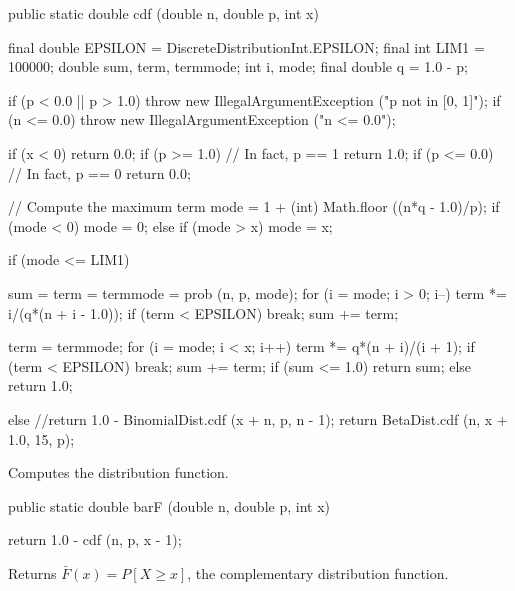 \begin{code}

   public static double cdf (double n, double p, int x)\begin{hide} {
      final double EPSILON = DiscreteDistributionInt.EPSILON;
      final int LIM1 = 100000;
      double sum, term, termmode;
      int i, mode;
      final double q = 1.0 - p;

      if (p < 0.0 || p > 1.0)
        throw new IllegalArgumentException ("p not in [0, 1]");
      if (n <= 0.0)
        throw new IllegalArgumentException ("n <= 0.0");

      if (x < 0)
         return 0.0;
      if (p >= 1.0)                  // In fact, p == 1
         return 1.0;
      if (p <= 0.0)                  // In fact, p == 0
         return 0.0;

      // Compute the maximum term
      mode = 1 + (int) Math.floor ((n*q - 1.0)/p);
      if (mode < 0)
          mode = 0;
      else if (mode > x)
         mode = x;

      if (mode <= LIM1) {
         sum = term = termmode = prob (n, p, mode);
         for (i = mode; i > 0; i--) {
            term *= i/(q*(n + i - 1.0));
            if (term < EPSILON)
               break;
            sum += term;
         }

         term = termmode;
         for (i = mode; i < x; i++) {
            term *= q*(n + i)/(i + 1);
            if (term < EPSILON)
               break;
            sum += term;
         }
         if (sum <= 1.0)
            return sum;
         else
            return 1.0;
      }
      else
         //return 1.0 - BinomialDist.cdf (x + n, p, n - 1);
         return BetaDist.cdf (n, x + 1.0, 15, p);
    }\end{hide}
\end{code}
  \begin{tabb} Computes the distribution function.
 \end{tabb}
\begin{code}

   public static double barF (double n, double p, int x)\begin{hide} {
      return 1.0 - cdf (n, p, x - 1);
   }\end{hide}
\end{code}
\begin{tabb}  Returns $\bar F(x) = P[X \ge x]$, the complementary
   distribution function.
\end{tabb}
